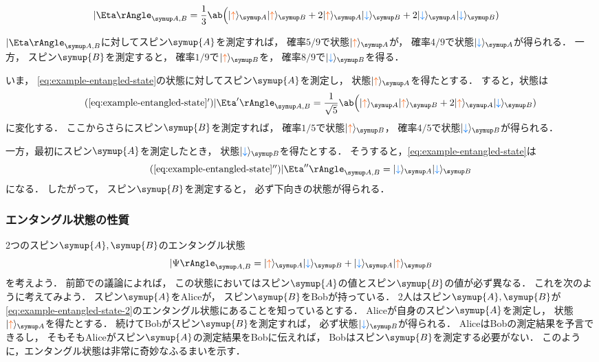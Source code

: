 \documentclass[
]{sotsu}
\newcommand{\bitone}{\mathcolor{fire}{\uparrow}}
\newcommand{\bittwo}{\mathcolor{water}{\downarrow}}
\begin{document}
\quad 
\begin{equation}
    \label{eq:example-entangled-state}
    \begin{split}
        \Ket{\Eta}<A,B>
        &= \frac{1}{3} \ab\Big(
            \ket{\bitone}<A> \ket{\bitone}<B>
            + 2 \ket{\bitone}<A> \ket{\bittwo}<B>
            + 2 \ket{\bittwo}<A> \ket{\bittwo}<B>
        )
    \end{split}
\end{equation}

$\Ket{\Eta}<A,B>$に対してスピン$\symup{A}$を測定すれば，
確率$5/9$で状態$\ket{\bitone}<A>$が，
確率$4/9$で状態$\ket{\bittwo}<A>$が得られる．
一方，
スピン$\symup{B}$を測定すると，
確率$1/9$で$\ket{\bitone}<B>$を，
確率$8/9$で$\ket{\bittwo}<B>$を得る．

いま，
\cref{eq:example-entangled-state}の状態に対してスピン$\symup{A}$を測定し，
状態$\ket{\bitone}<A>$を得たとする．
すると，状態は
\begin{equation*}
    \tag{\ref*{eq:example-entangled-state}$'$}
    \Ket{\Eta'}<A,B> = \frac{1}{\sqrt{5}} \ab\Big(
        \ket{\bitone}<A> \ket{\bitone}<B>
        + 2 \ket{\bitone}<A> \ket{\bittwo}<B>
    )
\end{equation*}
に変化する．
ここからさらにスピン$\symup{B}$を測定すれば，
確率$1/5$で状態$\ket{\bitone}<B>$，
確率$4/5$で状態$\ket{\bittwo}<B>$が得られる．

一方，最初にスピン$\symup{A}$を測定したとき，
状態$\ket{\bittwo}<B>$を得たとする．
そうすると，\cref{eq:example-entangled-state}は
\begin{equation*}
    \tag{\ref*{eq:example-entangled-state}$''$}
    \Ket{\Eta''}<A,B> = \ket{\bittwo}<A> \ket{\bittwo}<B>
\end{equation*}
になる．
したがって，
スピン$\symup{B}$を測定すると，
必ず下向きの状態が得られる．



\subsubsection{エンタングル状態の性質}

2つのスピン$\symup{A}, \symup{B}$のエンタングル状態
\begin{equation}
    \label{eq:example-entangled-state-2}
    \Ket{\Psi}<A,B> = \ket{\bitone}<A> \ket{\bittwo}<B> + \ket{\bittwo}<A> \ket{\bitone}<B>
\end{equation}
を考えよう．
前節での議論によれば，
この状態においてはスピン$\symup{A}$の値とスピン$\symup{B}$の値が必ず異なる．
これを次のように考えてみよう．
スピン$\symup{A}$をAliceが，
スピン$\symup{B}$をBobが持っている．
2人はスピン$\symup{A}, \symup{B}$が\cref{eq:example-entangled-state-2}のエンタングル状態にあることを知っているとする．
Aliceが自身のスピン$\symup{A}$を測定し，
状態$\ket{\bitone}<A>$を得たとする．
続けてBobがスピン$\symup{B}$を測定すれば，
必ず状態$\ket{\bittwo}<B>$が得られる．
AliceはBobの測定結果を予言できるし，
そもそもAliceがスピン$\symup{A}$の測定結果をBobに伝えれば，
Bobはスピン$\symup{B}$を測定する必要がない．
このように，エンタングル状態は非常に奇妙なふるまいを示す．
\end{document}
